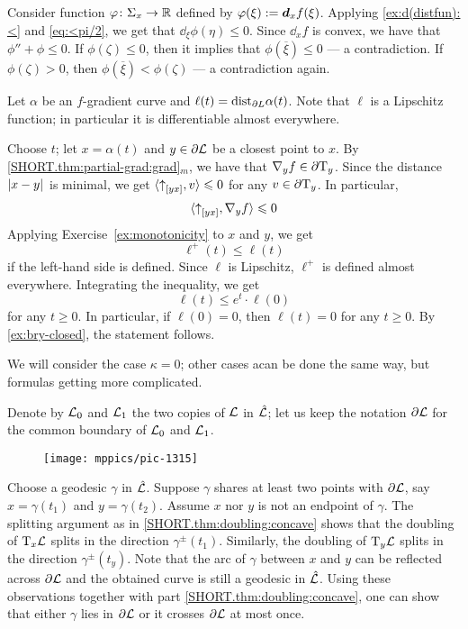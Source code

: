 Consider function $\varphi\colon\Sigma_x\to\mathbb{R}$ defined by $\varphi(\xi)\mathrel{:=}\bm{d}_xf(\xi)$.
Applying \ref{ex:d(distfun):<} and \ref{eq:<pi/2}, we get that $\dd_\xi\phi(\eta)\le 0$.
Since $\dd_xf$ is convex, we have that $\phi''+\phi\le 0$.
If $\phi(\zeta)\le 0$, then it implies that $\phi(\overline{\xi})\le 0$ --- a contradiction.
If $\phi(\zeta)> 0$, then $\phi(\overline{\xi})<\phi(\zeta)$ --- a contradiction again.

Let $\alpha$ be an $f$-gradient curve and $\ell(t)=\mathrm{dist}_{\partial L}\alpha(t)$.
Note that $\ell$ is a Lipschitz function;
in particular it is differentiable almost everywhere.

Choose $t$;
let $x=\alpha(t)$ and $y\in \partial\mathcal{L}$ be a closest point to $x$.
By \ref{SHORT.thm:partial-grad:grad}$_m$, we have that $\nabla_y f\in\partial \mathrm{T}_y$.
Since the distance $\dist{x}{y}{}$ is minimal, 
we get $\langle {\uparrow}_{[{y}{x}]},v\rangle\leqslant 0$ for any $v\in \partial \mathrm{T}_y$.
In particular,
\[\langle {\uparrow}_{[{y}{x}]},\nabla_y f\rangle\leqslant 0\]
Applying Exercise~\ref{ex:monotonicity} to $x$ and $y$, 
we get
\[\ell^+(t)\le \ell(t)\]
if the left-hand side is defined.
Since $\ell$ is Lipschitz, $\ell^+$ is defined almost everywhere.
Integrating the inequality, we get 
\[\ell(t)\le e^t\cdot\ell(0)\]
for any $t\ge 0$.
In particular, if $\ell(0)=0$, then $\ell(t)=0$ for any $t\ge 0$.
By \ref{ex:bry-closed}, the statement follows.

We will consider the case $\kappa=0$;
other cases acan be done the same way, but formulas getting more complicated.

Denote by $\mathcal{L}_0$ and $\mathcal{L}_1$ the two copies of $\mathcal{L}$ in $\hat{\mathcal{L}}$;
let us keep the notation $\partial \mathcal{L}$ for the common boundary of $\mathcal{L}_0$ and $\mathcal{L}_1$.

\begin{wrapfigure}{r}{45mm}
\vskip-2mm
\centering
\texttt{[image: mppics/pic-1315]}
\end{wrapfigure}

Choose a geodesic $\gamma$ in $\hat{\mathcal{L}}$.
Suppose $\gamma$ shares at least two points with $\partial \mathcal{L}$, say $x=\gamma(t_1)$ and $y=\gamma(t_2)$.
Assume $x$ nor $y$ is not an endpoint of $\gamma$.
The splitting argument as in \ref{SHORT.thm:doubling:concave} shows that the doubling of $\mathrm{T}_x\mathcal{L}$ splits in the direction $\gamma^\pm(t_1)$.
Similarly, the doubling of $\mathrm{T}_y\mathcal{L}$ splits in the direction $\gamma^\pm(t_y)$.
Note that the arc of $\gamma$ between $x$ and $y$ can be reflected across $\partial \mathcal{L}$ and the obtained curve is still a geodesic in $\hat{\mathcal{L}}$.
Using these observations together with part \ref{SHORT.thm:doubling:concave}, one can show that either $\gamma$ lies in $\partial \mathcal{L}$ or it crosses $\partial \mathcal{L}$ at most once.

